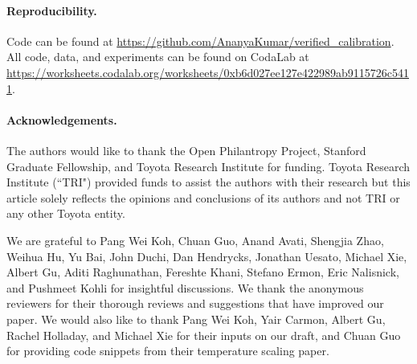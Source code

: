 \paragraph{Reproducibility.}

Code can be found at \url{https://github.com/AnanyaKumar/verified_calibration}.
All code, data, and experiments can be found on CodaLab at \url{https://worksheets.codalab.org/worksheets/0xb6d027ee127e422989ab9115726c5411}.

\paragraph{Acknowledgements.}

The authors would like to thank the Open Philantropy Project, Stanford Graduate Fellowship, and Toyota Research Institute for funding. Toyota Research Institute (``TRI") provided funds to assist the authors with their research but this article solely reflects the opinions and conclusions of its authors and not TRI or any other Toyota entity.

We are grateful to Pang Wei Koh, Chuan Guo, Anand Avati, Shengjia Zhao, Weihua Hu, Yu Bai, John Duchi, Dan Hendrycks, Jonathan Uesato, Michael Xie, Albert Gu, Aditi Raghunathan, Fereshte Khani, Stefano Ermon, Eric Nalisnick, and Pushmeet Kohli for insightful discussions. We thank the anonymous reviewers for their thorough reviews and suggestions that have improved our paper. We would also like to thank Pang Wei Koh, Yair Carmon, Albert Gu, Rachel Holladay, and Michael Xie for their inputs on our draft, and Chuan Guo for providing code snippets from their temperature scaling paper.






